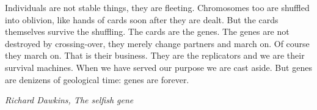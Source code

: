 \epigraph{Individuals are not stable things, they are fleeting. Chromosomes too
are shuffled into oblivion, like hands of cards soon after they are dealt. But
the cards themselves survive the shuffling. The cards are the genes. The genes
are not destroyed by crossing-over, they merely change partners and march on.
Of course they march on. That is their business. They are the replicators and
we are their survival machines. When we have served our purpose we are cast
aside. But genes are denizens of geological time: genes are forever.}
{\emph{Richard Dawkins, The selfish gene}}
